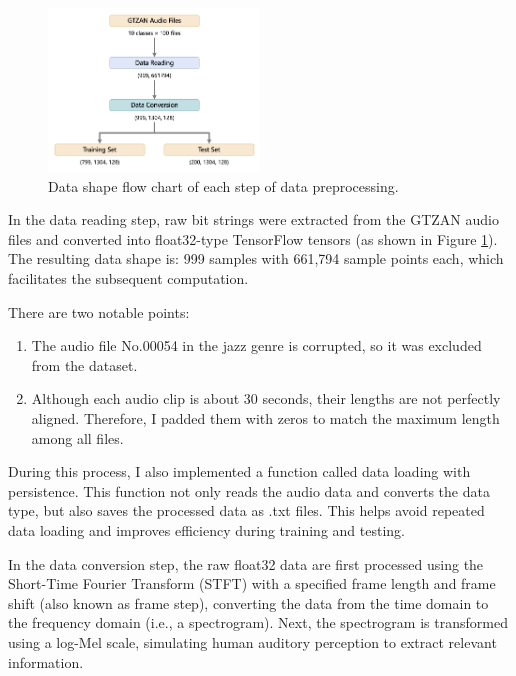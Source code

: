 \documentclass{article}
\begin{document}
      \begin{figure}[H]
        \centering
        \includegraphics[width=0.5\textwidth]{figures/shape_preprocess.png}
        \caption{Data shape flow chart of each step of data preprocessing.}
        \label{fig:shape_preprocess}
      \end{figure}

      In the data reading step, raw bit strings were extracted from the GTZAN audio files and converted into float32-type TensorFlow tensors (as shown in Figure \ref{fig:shape_preprocess}). The resulting data shape is: 999 samples with 661,794 sample points each, which facilitates the subsequent computation.

      There are two notable points:

      \begin{enumerate}
        \item The audio file No.00054 in the jazz genre is corrupted, so it was excluded from the dataset.
        \item Although each audio clip is about 30 seconds, their lengths are not perfectly aligned. Therefore, I padded them with zeros to match the maximum length among all files.
      \end{enumerate}
      
      During this process, I also implemented a function called data loading with persistence. This function not only reads the audio data and converts the data type, but also saves the processed data as .txt files. This helps avoid repeated data loading and improves efficiency during training and testing.

      In the data conversion step, the raw float32 data are first processed using the Short-Time Fourier Transform (STFT) with a specified frame length and frame shift (also known as frame step), converting the data from the time domain to the frequency domain (i.e., a spectrogram). Next, the spectrogram is transformed using a log-Mel scale, simulating human auditory perception to extract relevant information.
\end{document}
